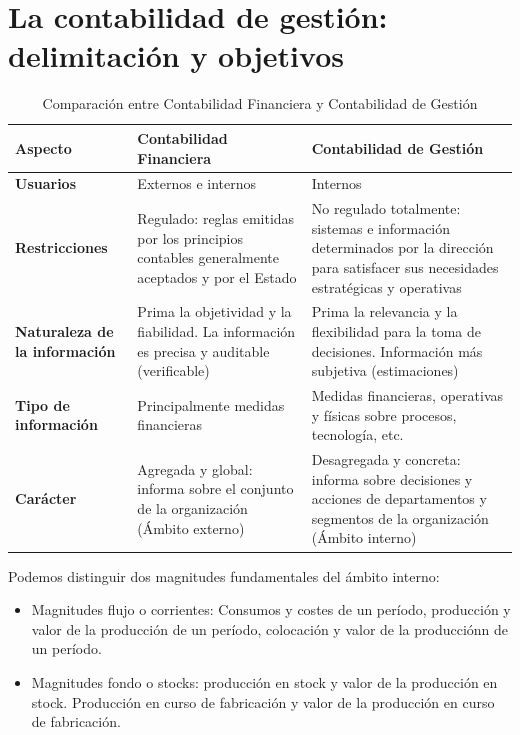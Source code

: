 \documentclass[12pt]{report} %
\providecommand{\tightlist}{%
  \setlength{\itemsep}{0pt}\setlength{\parskip}{0pt}}
\begin{document}
\hypertarget{la-contabilidad-de-gestiuxf3n-delimitaciuxf3n-y-objetivos}{%
\section{La contabilidad de gestión: delimitación y
objetivos}\label{la-contabilidad-de-gestiuxf3n-delimitaciuxf3n-y-objetivos}}

\begin{table}[H]
\centering
\begin{tabular}{|l|p{5cm}|p{5cm}|}
\hline
\textbf{Aspecto} & \textbf{Contabilidad Financiera} & \textbf{Contabilidad de Gestión} \\ \hline
\textbf{Usuarios} & Externos e internos & Internos \\ \hline
\textbf{Restricciones} & Regulado: reglas emitidas por los principios contables generalmente aceptados y por el Estado & No regulado totalmente: sistemas e información determinados por la dirección para satisfacer sus necesidades estratégicas y operativas \\ \hline
\textbf{Naturaleza de la información} & Prima la objetividad y la fiabilidad. La información es precisa y auditable (verificable) & Prima la relevancia y la flexibilidad para la toma de decisiones. Información más subjetiva (estimaciones) \\ \hline
\textbf{Tipo de información} & Principalmente medidas financieras & Medidas financieras, operativas y físicas sobre procesos, tecnología, etc. \\ \hline
\textbf{Carácter} & Agregada y global: informa sobre el conjunto de la organización (Ámbito externo) & Desagregada y concreta: informa sobre decisiones y acciones de departamentos y segmentos de la organización (Ámbito interno) \\ \hline
\end{tabular}
\caption{Comparación entre Contabilidad Financiera y Contabilidad de Gestión}
\end{table}

Podemos distinguir dos magnitudes fundamentales del ámbito interno:

\begin{itemize}
\tightlist
\item
  Magnitudes flujo o corrientes: Consumos y costes de un período,
  producción y valor de la producción de un período, colocación y valor
  de la producciónn de un período.
\item
  Magnitudes fondo o stocks: producción en stock y valor de la
  producción en stock. Producción en curso de fabricación y valor de la
  producción en curso de fabricación.
\end{itemize}
\end{document}
